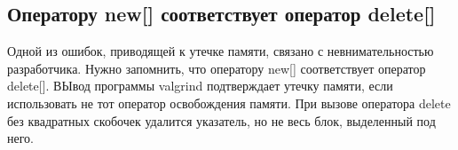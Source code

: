 \documentclass[10pt]{article}
\begin{document}
\subsection{Оператору new[] соответствует оператор delete[]}
Одной из ошибок, приводящей к утечке памяти, связано с невнимательностью разработчика.
Нужно запомнить, что оператору new[] соответствует оператор delete[]. ВЫвод программы valgrind подтверждает утечку памяти,
если использовать не тот оператор освобождения памяти. При вызове оператора delete без квадратных скобочек
удалится указатель, но не весь блок, выделенный под него.
\end{document}
